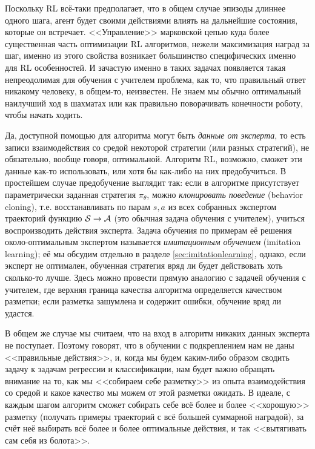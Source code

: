 Поскольку RL всё-таки предполагает, что в общем случае эпизоды длиннее одного шага, агент будет своими действиями влиять на дальнейшие состояния, которые он встречает. <<Управление>> марковской цепью куда более существенная часть оптимизации RL алгоритмов, нежели максимизация наград за шаг, именно из этого свойства возникает большинство специфических именно для RL особенностей. И зачастую именно в таких задачах появляется такая непреодолимая для обучения с учителем проблема, как то, что правильный ответ никакому человеку, в общем-то, неизвестен. Не знаем мы обычно оптимальный наилучший ход в шахматах или как правильно поворачивать конечности роботу, чтобы начать ходить. 

Да, доступной помощью для алгоритма могут быть \emph{данные от эксперта}, то есть записи взаимодействия со средой некоторой стратегии (или разных стратегий), не обязательно, вообще говоря, оптимальной. Алгоритм RL, возможно, сможет эти данные как-то использовать, или хотя бы как-либо на них предобучиться. В простейшем случае предобучение выглядит так: если в алгоритме присутствует параметрически заданная стратегия $\pi_\theta$, можно \emph{клонировать поведение} (behavior cloning), т.е. восстанавливать по парам $s, a$ из всех собранных экспертом траекторий функцию $\St \HM\to \A$ (это обычная задача обучения с учителем), учиться воспроизводить действия эксперта. Задача обучения по примерам её решения около-оптимальным экспертом называется \emph{имитационным обучением} (imitation learning); её мы обсудим отдельно в разделе \ref{sec:imitationlearning}, однако, если эксперт не оптимален, обученная стратегия вряд ли будет действовать хоть сколько-то лучше. Здесь можно провести прямую аналогию с задачей обучения с учителем, где верхняя граница качества алгоритма определяется качеством разметки; если разметка зашумлена и содержит ошибки, обучение вряд ли удастся. 

В общем же случае мы считаем, что на вход в алгоритм никаких данных эксперта не поступает. Поэтому говорят, что в обучении с подкреплением нам не даны <<правильные действия>>, и, когда мы будем каким-либо образом сводить задачу к задачам регрессии и классификации, нам будет важно обращать внимание на то, как мы <<собираем себе разметку>> из опыта взаимодействия со средой и какое качество мы можем от этой разметки ожидать. В идеале, с каждым шагом алгоритм сможет собирать себе всё более и более <<хорошую>> разметку (получать примеры траекторий с всё большей суммарной наградой), за счёт неё выбирать всё более и более оптимальные действия, и так <<вытягивать сам себя из болота>>.

